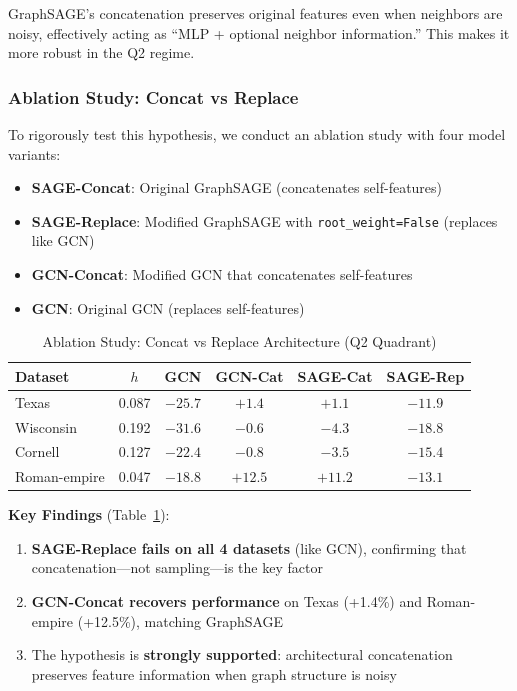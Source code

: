 GraphSAGE's concatenation preserves original features even when neighbors are noisy, effectively acting as ``MLP + optional neighbor information.'' This makes it more robust in the Q2 regime.

\subsubsection{Ablation Study: Concat vs Replace}

To rigorously test this hypothesis, we conduct an ablation study with four model variants:
\begin{itemize}
    \item \textbf{SAGE-Concat}: Original GraphSAGE (concatenates self-features)
    \item \textbf{SAGE-Replace}: Modified GraphSAGE with \texttt{root\_weight=False} (replaces like GCN)
    \item \textbf{GCN-Concat}: Modified GCN that concatenates self-features
    \item \textbf{GCN}: Original GCN (replaces self-features)
\end{itemize}

\begin{table}[t]
\centering
\caption{Ablation Study: Concat vs Replace Architecture (Q2 Quadrant)}
\label{tab:ablation_concat}
\begin{tabular}{@{}lccccc@{}}
\toprule
Dataset & $h$ & GCN & GCN-Cat & SAGE-Cat & SAGE-Rep \\
\midrule
Texas & 0.087 & $-25.7$ & $+1.4$ & $+1.1$ & $-11.9$ \\
Wisconsin & 0.192 & $-31.6$ & $-0.6$ & $-4.3$ & $-18.8$ \\
Cornell & 0.127 & $-22.4$ & $-0.8$ & $-3.5$ & $-15.4$ \\
Roman-empire & 0.047 & $-18.8$ & $\mathbf{+12.5}$ & $\mathbf{+11.2}$ & $-13.1$ \\
\bottomrule
\end{tabular}
\end{table}

\textbf{Key Findings} (Table~\ref{tab:ablation_concat}):
\begin{enumerate}
    \item \textbf{SAGE-Replace fails on all 4 datasets} (like GCN), confirming that concatenation---not sampling---is the key factor
    \item \textbf{GCN-Concat recovers performance} on Texas (+1.4\%) and Roman-empire (+12.5\%), matching GraphSAGE
    \item The hypothesis is \textbf{strongly supported}: architectural concatenation preserves feature information when graph structure is noisy
\end{enumerate}

